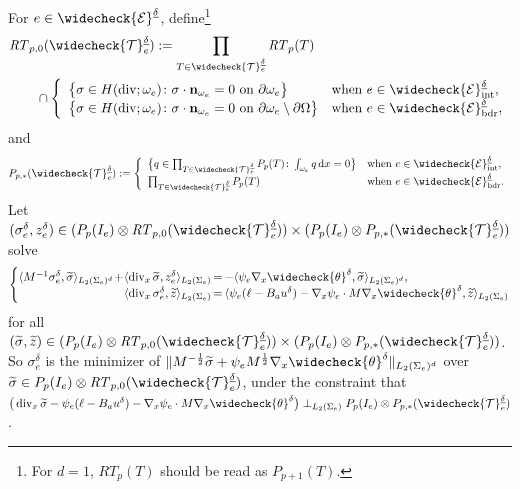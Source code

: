 \documentclass{amsart}
\numberwithin{equation}{section}
\newcommand{\cE}{\mathcal E}
\newcommand{\1}{\mathbb 1}
\newcommand*\diff{\mathop{}\!\mathrm{d}}
\DeclareMathOperator{\divv}{div}
\newcommand{\be}{\begin{equation}}
\newcommand{\ee}{\end{equation}}
\newcommand{\tria}{{\mathcal T}}
\newcommand{\RT}{\mathit{RT}}
\begin{document}
For $e \in \widecheck{\cE}^{\underline{\delta}}$, define\footnote{For $d=1$, $ \RT_{p}(T)$ should be read as $P_{p+1}(T)$.}
\begin{align*}
&\RT_{p,0}(\widecheck\tria^{\underline{\delta}}_e) := \prod_{T \in \widecheck\tria^{\underline{\delta}}_e} \RT_{p}(T)  \\
&\qquad \cap \left\{\begin{array}{ll}  \big\{\sigma \in H(\divv;\omega_e)\colon \sigma \cdot {\bf n}_{\omega_e}=0 \text{ on } \partial\omega_e\big\} & \text{when } e \in \widecheck{\cE}^{\underline{\delta}}_{\text{int}},\\
\big\{\sigma \in H(\divv;\omega_e)\colon \sigma \cdot {\bf n}_{\omega_e}=0 \text{ on } \partial\omega_e\setminus \partial\Omega\big\} & \text{when }  e \in \widecheck{\cE}^{\underline{\delta}}_{\text{bdr}}, \end{array}\right.
\end{align*}
and
$$
P_{p,*}(\widecheck\tria^{\underline{\delta}}_e):=\left\{\begin{array}{ll}  \big\{q \in \prod_{T \in \widecheck\tria^{\underline{\delta}}_e} P_{p}(T) \colon \int_{\omega_e} q \diff x=0\big\} & \text{when } e \in \widecheck{\cE}^{\underline{\delta}}_{\text{int}},\\
\prod_{T \in \widecheck\tria^{\underline{\delta}}_e} P_{p}(T)& \text{when }  e \in \widecheck{\cE}^{\underline{\delta}}_{\text{bdr}}. \end{array}\right.
$$
Let 
 $(\sigma_e^\delta,z_{e}^\delta) \in (P_p(I_e) \otimes \RT_{p,0}(\widecheck\tria^{\underline{\delta}}_e)) \times (P_p(I_e) \otimes P_{p,*}(\widecheck\tria^{\underline{\delta}}_e))$ solve
 \be \label{eq:16}
 \left\{
 \begin{array}{@{}r@{}c@{}l@{}}
 \langle M^{-1}\sigma_e^\delta, \widetilde{\sigma}\rangle_{L_2(\Sigma_e)^d}\!+\! \langle \divv_x \widetilde{\sigma}, z_{e}^\delta \rangle_{L_2(\Sigma_e)} & \,=\, & - \langle \psi_e \nabla_x \widecheck{\theta}^\delta, \widetilde{\sigma}\rangle_{L_2(\Sigma_e)^d} ,\\
 \langle \divv_x \sigma_e^\delta, \widetilde{z} \rangle_{L_2(\Sigma_e)} &\,= \,& \langle \psi_e (\ell-B_a u^\delta) - \nabla_x \psi_e\cdot M \nabla_x \widecheck{\theta}^\delta, \widetilde{z}\rangle_{L_2(\Sigma_e)}
 \end{array}
 \right.
 \ee
for all  $(\widetilde{\sigma},\widetilde{z}) \in (P_p(I_e) \otimes\RT_{p,0}(\widecheck\tria^{\underline{\delta}}_e)) \times (P_p(I_e) \otimes P_{p,*}(\widecheck\tria^{\underline{\delta}}_e))$. So
$\sigma_e^\delta$ is the minimizer of $ \|M^{-\frac12} \widetilde{\sigma}+\psi_e M^{\frac12} \nabla_x \widecheck{\theta}^\delta\|_{L_2(\Sigma_e)^d}$ over $\widetilde{\sigma}\in P_p(I_e) \otimes \RT_{p,0}(\widecheck\tria^{\underline{\delta}}_e)$, under the constraint that $\big(\divv_x \widetilde{\sigma}-\psi_e (\ell-B_a u^\delta) - \nabla_x \psi_e\cdot M \nabla_x \widecheck{\theta}^\delta \big)\perp_{L_2(\Sigma_e)}P_p(I_e) \otimes P_{p,*}(\widecheck\tria^{\underline{\delta}}_e)$.
\end{document}
